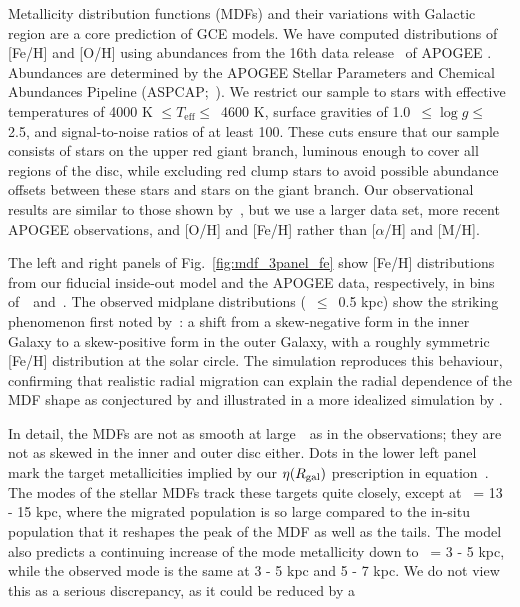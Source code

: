 \documentclass[draft2.tex]{subfiles}
\begin{document}
Metallicity distribution functions (MDFs) and their variations with Galactic 
region are a core prediction of GCE models. 
We have computed distributions of [Fe/H] and [O/H] using abundances from the 
16th data release~\citep[DR16;][]{Ahumada2020, Joensson2020} of APOGEE 
\citep{Majewski2017}. 
Abundances are determined by the APOGEE Stellar Parameters and Chemical 
Abundances Pipeline (ASPCAP;~\citealp{Holtzman2015, GarciaPerez2016}). 
We restrict our sample to stars with effective temperatures of 4000 K 
$\leq T_\text{eff} \leq$~4600 K, surface gravities of 1.0~$\leq \log g \leq$ 
2.5, and signal-to-noise ratios of at least 100. 
These cuts ensure that our sample consists of stars on the upper red giant 
branch, luminous enough to cover all regions of the disc, while excluding red 
clump stars to avoid possible abundance offsets between these stars and stars 
on the giant branch. 
Our observational results are similar to those shown by~\citet{Hayden2015}, 
but we use a larger data set, more recent APOGEE observations, and [O/H] and 
[Fe/H] rather than [$\alpha$/H] and [M/H]. 
\par 
The left and right panels of Fig.~\ref{fig:mdf_3panel_fe} show [Fe/H] 
distributions from our fiducial inside-out model and the APOGEE data, 
respectively, in bins of~\rgal~and~\absz. 
The observed midplane distributions (\absz~$\leq$~0.5 kpc) show the striking 
phenomenon first noted by~\citet{Hayden2015}: a shift from a skew-negative form 
in the inner Galaxy to a skew-positive form in the outer Galaxy, with a roughly 
symmetric [Fe/H] distribution at the solar circle. 
The simulation reproduces this behaviour, confirming that realistic radial 
migration can explain the radial dependence of the MDF shape as conjectured by 
\citet{Hayden2015} and illustrated in a more idealized simulation by 
\citet{Loebman2016}. 
\par 
In detail, the MDFs are not as smooth at large~\rgal~as in the observations; 
they are not as skewed in the inner and outer disc either. 
Dots in the lower left panel mark the target metallicities implied by our 
$\eta(R_\text{gal})$ prescription in equation~. 
The modes of the stellar MDFs track these targets quite closely, except at 
\rgal~= 13 - 15 kpc, where the migrated population is so large compared to the 
in-situ population that it reshapes the peak of the MDF as well as the tails. 
The model also predicts a continuing increase of the mode metallicity down to 
\rgal~= 3 - 5 kpc, while the observed mode is the same at 3 - 5 kpc and 5 - 7 
kpc. 
We do not view this as a serious discrepancy, as it could be reduced by a
\end{document}
